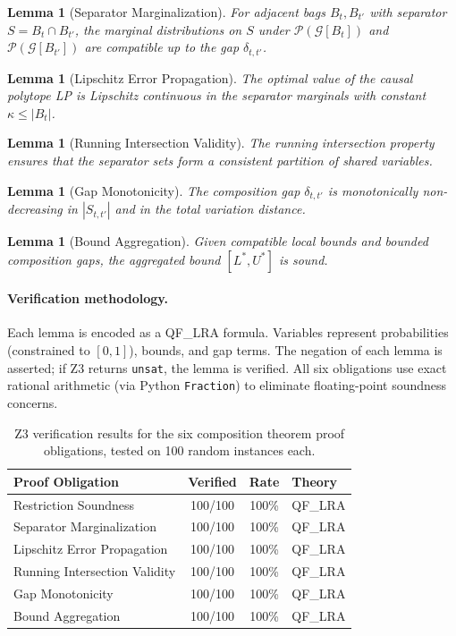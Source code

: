 \documentclass[11pt,a4paper]{article}
\newtheorem{lemma}[theorem]{Lemma}
\newcommand{\calG}{\mathcal{G}}
\newcommand{\calP}{\mathcal{P}}
\begin{document}
\begin{lemma}[Separator Marginalization]
\label{lem:separator}
For adjacent bags $B_t, B_{t'}$ with separator $S = B_t \cap B_{t'}$, the marginal distributions on $S$ under $\calP(\calG[B_t])$ and $\calP(\calG[B_{t'}])$ are compatible up to the gap $\delta_{t,t'}$.
\end{lemma}

\begin{lemma}[Lipschitz Error Propagation]
\label{lem:lipschitz}
The optimal value of the causal polytope LP is Lipschitz continuous in the separator marginals with constant $\kappa \leq |B_t|$.
\end{lemma}

\begin{lemma}[Running Intersection Validity]
\label{lem:rip}
The running intersection property ensures that the separator sets form a consistent partition of shared variables.
\end{lemma}

\begin{lemma}[Gap Monotonicity]
\label{lem:monotone}
The composition gap $\delta_{t,t'}$ is monotonically non-decreasing in $|S_{t,t'}|$ and in the total variation distance.
\end{lemma}

\begin{lemma}[Bound Aggregation]
\label{lem:aggregate}
Given compatible local bounds and bounded composition gaps, the aggregated bound $[L^*, U^*]$ is sound.
\end{lemma}

\paragraph{Verification methodology.} Each lemma is encoded as a QF\_LRA formula. Variables represent probabilities (constrained to $[0,1]$), bounds, and gap terms. The negation of each lemma is asserted; if Z3 returns \texttt{unsat}, the lemma is verified. All six obligations use exact rational arithmetic (via Python \texttt{Fraction}) to eliminate floating-point soundness concerns.

\begin{table}[t]
\centering
\caption{Z3 verification results for the six composition theorem proof obligations, tested on 100 random instances each.}
\label{tab:z3-results}
\begin{tabular}{@{}lccl@{}}
\toprule
\textbf{Proof Obligation} & \textbf{Verified} & \textbf{Rate} & \textbf{Theory} \\
\midrule
Restriction Soundness & 100/100 & 100\% & QF\_LRA \\
Separator Marginalization & 100/100 & 100\% & QF\_LRA \\
Lipschitz Error Propagation & 100/100 & 100\% & QF\_LRA \\
Running Intersection Validity & 100/100 & 100\% & QF\_LRA \\
Gap Monotonicity & 100/100 & 100\% & QF\_LRA \\
Bound Aggregation & 100/100 & 100\% & QF\_LRA \\
\bottomrule
\end{tabular}
\end{table}
\end{document}
